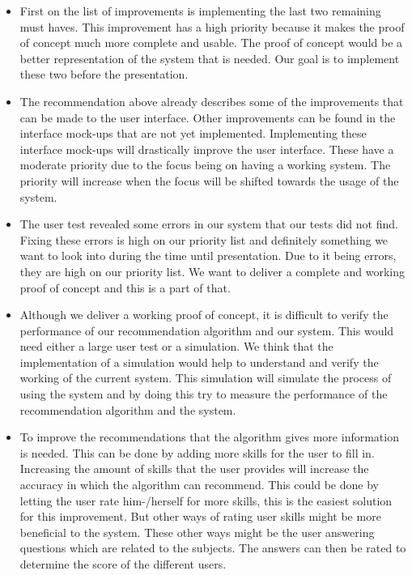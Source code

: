 \begin{itemize}
\item First on the list of improvements is implementing the last two remaining must haves.
This improvement has a high priority because it makes the proof of concept much more complete and usable.
The proof of concept would be a better representation of the system that is needed.
Our goal is to implement these two before the presentation.

\item The recommendation above already describes some of the improvements that can be made to the user interface.
Other improvements can be found in the interface mock-ups that are not yet implemented.
Implementing these interface mock-ups will drastically improve the user interface.
These have a moderate priority due to the focus being on having a working system.
The priority will increase when the focus will be shifted towards the usage of the system.

\item The user test revealed some errors in our system that our tests did not find.
Fixing these errors is high on our priority list and definitely something we want to look into during the time until presentation.
Due to it being errors, they are high on our priority list.
We want to deliver a complete and working proof of concept and this is a part of 
that.

\item Although we deliver a working proof of concept, it is difficult to verify the performance of our recommendation algorithm and our system.
This would need either a large user test or a simulation.
We think that the implementation of a simulation would help to understand and verify the working of the current system.
This simulation will simulate the process of using the system and by doing this try to measure the performance of the recommendation algorithm and the system.

\item To improve the recommendations that the algorithm gives more information is needed.
This can be done by adding more skills for the user to fill in.
Increasing the amount of skills that the user provides will increase the accuracy in which the algorithm can recommend.
This could be done by letting the user rate him-/herself for more skills, this is the easiest solution for this improvement.
But other ways of rating user skills might be more beneficial to the system.
These other ways might be the user answering questions which are related to the subjects.
The answers can then be rated to determine the score of the different users.


\end{itemize}
